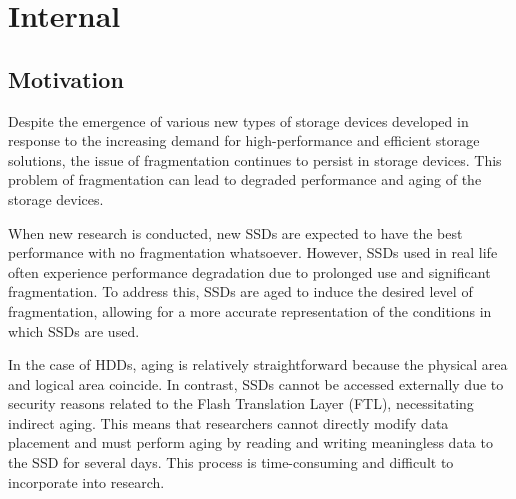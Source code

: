 \section{Internal} %
\label{s:internal}

\subsection{Motivation}
Despite the emergence of various new types of storage devices developed in response to the increasing demand for high-performance and efficient storage solutions, the issue of fragmentation continues to persist in storage devices.
This problem of fragmentation can lead to degraded performance and aging of the storage devices.

When new research is conducted, new SSDs are expected to have the best performance with no fragmentation whatsoever. 
However, SSDs used in real life often experience performance degradation due to prolonged use and significant fragmentation. 
To address this, SSDs are aged to induce the desired level of fragmentation, allowing for a more accurate representation of the conditions in which SSDs are used.

In the case of HDDs, aging is relatively straightforward because the physical area and logical area coincide. 
In contrast, SSDs cannot be accessed externally due to security reasons related to the Flash Translation Layer (FTL), necessitating indirect aging.
This means that researchers cannot directly modify data placement and must perform aging by reading and writing meaningless data to the SSD for several days. 
This process is time-consuming and difficult to incorporate into research.

